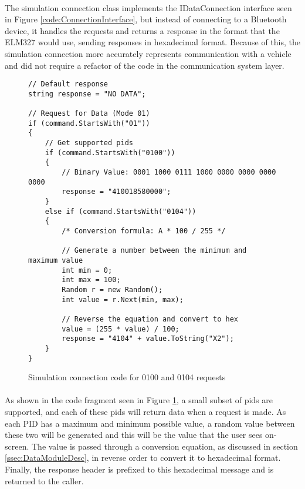 {{		\paragraph{}{
		The simulation connection class implements the IDataConnection interface seen in Figure \ref{code:ConnectionInterface}, but instead of connecting to a Bluetooth device, it handles the requests and returns a response in the format that the ELM327 would use, sending responses in hexadecimal format. Because of this, the simulation connection more accurately represents communication with a vehicle and did not require a refactor of the code in the communication system layer.
		}	
		\begin{figure}[h]
			\begin{lstlisting}
// Default response
string response = "NO DATA";

// Request for Data (Mode 01)
if (command.StartsWith("01"))
{
	// Get supported pids
	if (command.StartsWith("0100"))
    {
		// Binary Value: 0001 1000 0111 1000 0000 0000 0000 0000
		response = "410018580000";
	}
    else if (command.StartsWith("0104"))
	{
    	/* Conversion formula: A * 100 / 255 */
    	
    	// Generate a number between the minimum and maximum value
        int min = 0;
		int max = 100;
        Random r = new Random();
		int value = r.Next(min, max);

		// Reverse the equation and convert to hex
        value = (255 * value) / 100;
		response = "4104" + value.ToString("X2");
	}
}
			\end{lstlisting}
			\caption{Simulation connection code for 0100 and 0104 requests}
			\label{code:SimConnectionData}
		\end{figure}

		\paragraph{}{
		As shown in the code fragment seen  in Figure \ref{code:SimConnectionData}, a small subset of pids are supported, and each of these pids will return data when a request is made. As each PID has a maximum and minimum possible value, a random value between these two will be generated and this will be the value that the user sees on-screen. The value  is passed through a conversion equation, as discussed in section \ref{ssec:DataModuleDesc}, in reverse order to convert it to hexadecimal format. Finally, the response header is prefixed to this hexadecimal message and is returned to the caller.
		}
}}
